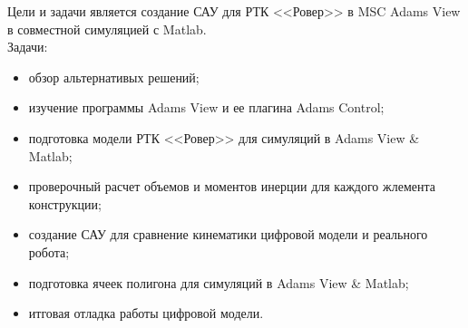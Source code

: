 \documentclass[12pt, aspectratio=169]{beamer}
\begin{document}
    \begin{frame}{Цели и задачи}
        является создание САУ для РТК <<Ровер>> в MSC Adams View в совместной симуляцией с Matlab.
      \\ Задачи:
      \begin{itemize}
        \item \small обзор альтернативых решений;
        \item \small изучение программы Adams View и ее плагина Adams Control;
        \item \small подготовка модели РТК <<Ровер>> для симуляций в Adams View \& Matlab;
        \item \small проверочный расчет объемов и моментов инерции для каждого жлемента конструкции;
        \item \small создание САУ для сравнение кинематики цифровой модели и реального робота;
        \item \small подготовка ячеек полигона для симуляций в Adams View \& Matlab;
        \item \small итговая отладка работы цифровой модели.
      \end{itemize}
    \end{frame}
\end{document}
